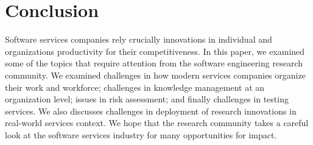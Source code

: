 \documentclass{sig-alternate}
\begin{document}


%





\section{Conclusion}
Software services companies rely crucially innovations in individual and organizations productivity for their competitiveness. In this paper, we examined some of the topics that require attention from the software engineering research community. We examined challenges in how modern services companies organize their work and workforce; challenges in knowledge management at an organization level; issues in risk assessment; and finally challenges in testing services. We also discusses challenges in deployment of research innovations in real-world services context. We hope that the research community takes a careful look at the software services industry for many opportunities for impact. 


{\small

}
\end{document}
